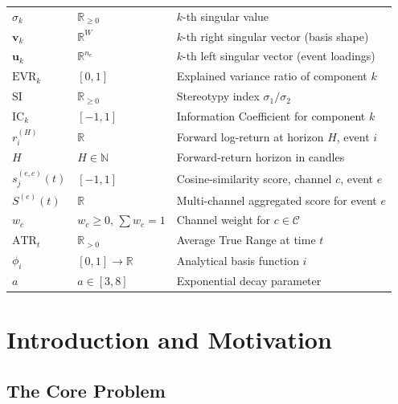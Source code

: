 \documentclass[11pt,a4paper]{article}
\theoremstyle{definition}
\theoremstyle{plain}
\newcommand{\R}{\mathbb{R}}
\newcommand{\N}{\mathbb{N}}
\newcommand{\bvec}[1]{\mathbf{#1}}
\begin{document}
\begin{center}
\begin{tabular}{lll}
$\sigma_k$        & $\R_{\geq 0}$                 & $k$-th singular value \\
$\bvec{v}_k$      & $\R^W$                        & $k$-th right singular vector (basis shape) \\
$\bvec{u}_k$      & $\R^{n_e}$                    & $k$-th left singular vector (event loadings) \\
$\mathrm{EVR}_k$  & $[0,1]$                       & Explained variance ratio of component $k$ \\
$\mathrm{SI}$     & $\R_{\geq 0}$                 & Stereotypy index $\sigma_1/\sigma_2$ \\
$\mathrm{IC}_k$   & $[-1,1]$                      & Information Coefficient for component $k$ \\
$r_i^{(H)}$       & $\R$                          & Forward log-return at horizon $H$, event $i$ \\
$H$               & $H \in \N$                    & Forward-return horizon in candles \\
$s^{(e,c)}_j(t)$  & $[-1,1]$                      & Cosine-similarity score, channel $c$, event $e$ \\
$S^{(e)}(t)$      & $\R$                          & Multi-channel aggregated score for event $e$ \\
$w_c$             & $w_c \geq 0$, $\sum w_c = 1$  & Channel weight for $c \in \mathcal{C}$ \\
$\mathrm{ATR}_t$  & $\R_{>0}$                     & Average True Range at time $t$ \\
$\phi_i$          & $[0,1] \to \R$                & Analytical basis function $i$ \\
$a$               & $a \in [3,8]$                 & Exponential decay parameter \\
\hline
\end{tabular}
\end{center}

\section{Introduction and Motivation}
\label{sec:intro}

\subsection{The Core Problem}
\end{document}
